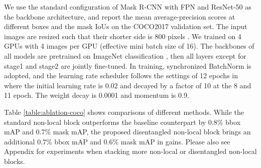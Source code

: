 \documentclass[runningheads]{llncs}
\begin{document}
We use the standard configuration of Mask R-CNN \cite{he2017mask} with FPN and ResNet-50 as the backbone architecture, and report the mean average-precision scores at different boxes and the mask IoUs on the COCO2017 validation set.
The input images are resized such that their shorter side is 800 pixels \cite{he2017fpn}.
We trained on 4 GPUs with 4 images per GPU (effective mini batch size of 16).
The backbones of all models are pretrained on ImageNet classification \cite{deng2009imagenet}, then all layers except for stage1 and stage2 are jointly fine-tuned.
In training, synchronized BatchNorm is adopted, and the learning rate scheduler follows the  settings of 12 epochs in \cite{he2017mask} where the initial learning rate is 0.02 and decayed by a factor of 10 at the 8 and 11 epoch. The weight decay is 0.0001 and momentum is 0.9.

Table \ref{table:ablation-coco} shows comparisons of different methods. While the standard non-local block outperforms the baseline counterpart by 0.8\% bbox mAP and 0.7\% mask mAP, the proposed disentangled non-local block brings an additional 0.7\% bbox mAP and 0.6\% mask mAP in gains. Please also see Appendix for experiments when stacking more non-local or disentangled non-local blocks.
\end{document}
